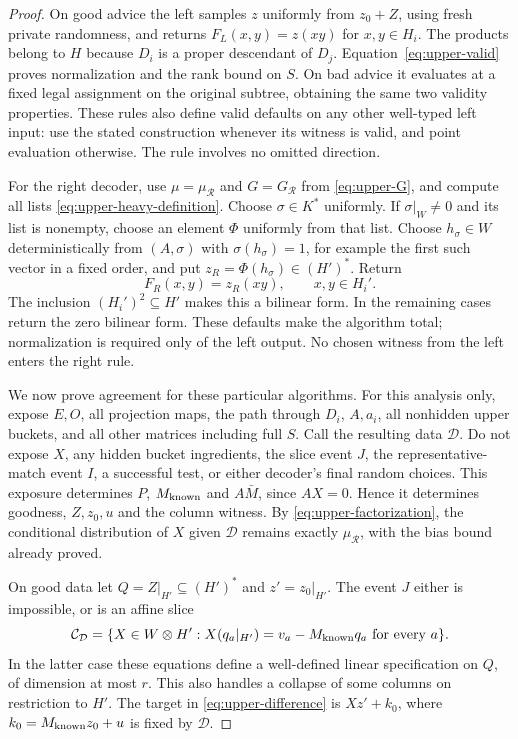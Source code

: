 \begin{proof}
On good advice the left samples $z$ uniformly from $z_0+Z$, using fresh
private randomness, and returns $F_L(x,y)=z(xy)$ for $x,y\in H_i$.
The products belong to $H$ because $D_i$ is a proper descendant of $D_j$.
Equation~\eqref{eq:upper-valid} proves normalization and the rank bound
on $S$.  On bad advice it evaluates at a fixed legal assignment on the
original subtree, obtaining the same two validity properties.  These rules
also define valid defaults on any other well-typed left input: use the
stated construction whenever its witness is valid, and point evaluation
otherwise.  The rule involves no omitted direction.

For the right decoder, use $\mu=\mu_{\mathcal R}$ and
$G=G_{\mathcal R}$ from \eqref{eq:upper-G}, and compute all lists
\eqref{eq:upper-heavy-definition}.  Choose $\sigma\in K^*$ uniformly.
If $\sigma|_W\ne0$ and its list is nonempty, choose an element $\Phi$
uniformly from that list.  Choose $h_\sigma\in W$ deterministically from
$(A,\sigma)$ with $\sigma(h_\sigma)=1$, for example the first such vector
in a fixed order, and put $z_R=\Phi(h_\sigma)\in(H')^*$.  Return
\begin{equation}\label{eq:upper-right-form}
 F_R(x,y)=z_R(xy),\qquad x,y\in H_i'.
\end{equation}
The inclusion $(H_i')^2\subseteq H'$ makes this a bilinear form.  In the
remaining cases return the zero bilinear form.  These defaults make the
algorithm total; normalization is required only of the left output.
No chosen witness from the left enters the right rule.

We now prove agreement for these particular algorithms.  For this analysis
only, expose $E,O$, all projection maps, the path through $D_i$, $A,a_i$,
all nonhidden upper buckets, and all other matrices including full $S$.
Call the resulting data $\mathcal D$.  Do not expose $X$, any hidden
bucket ingredients, the slice event $J$, the representative-match event
$I$, a successful test, or either decoder's final random choices.
This exposure determines $P$, $M_{\rm known}$ and $A\bar M$, since
$AX=0$.  Hence it determines goodness, $Z,z_0,u$ and the column witness.
By \eqref{eq:upper-factorization}, the conditional distribution of $X$
given $\mathcal D$ remains exactly $\mu_{\mathcal R}$, with the bias
bound already proved.

On good data let $Q=Z|_{H'}\subseteq(H')^*$ and $z'=z_0|_{H'}$.
The event $J$ either is impossible, or is an affine slice
\[
 \mathcal C_{\mathcal D}=
 \{X\in W\otimes H':X(q_a|_{H'})=v_a-M_{\rm known}q_a
                         \text{ for every }a\}.
\]
In the latter case these equations define a well-defined linear
specification on $Q$, of dimension at most $r$.  This also handles a
collapse of some columns on restriction to $H'$.  The target in
\eqref{eq:upper-difference} is $Xz'+k_0$, where
$k_0=M_{\rm known}z_0+u$ is fixed by $\mathcal D$.


\end{proof}
